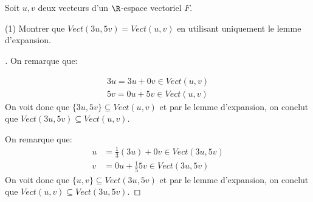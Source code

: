 \section[Demonstrations]{}

Soit \(u, v\) deux vecteurs d'un \(\R\)-espace vectoriel \(F\).

(1) Montrer que \(Vect(3u, 5v) = Vect(u, v)\) en utilisant uniquement le lemme d'expansion.

\begin{proof}[\unskip\nopunct] 
   \fbox{\(\subseteq\)} 
   On remarque que: 

   \begin{align*}
      3u = 3u + 0v \in Vect(u, v)\\ 
      5v = 0u + 5v \in Vect(u, v) 
   \end{align*}   
   On voit donc que \(\{3u, 5v\} \subseteq Vect(u, v)\) et par le lemme d'expansion, on conclut que \(Vect(3u, 5v) \subseteq Vect(u, v)\).\<

   \fbox{\(\supseteq\)}
   On remarque que: 
   \begin{align*}
      u &= \frac{1}{3}(3u) + 0v \in Vect(3u, 5v)\\ 
      v &= 0u + \frac{1}{5}5v \in Vect(3u, 5v) 
   \end{align*}   
   On voit donc que \(\{u, v\} \subseteq Vect(3u, 5v)\) et par le lemme d'expansion, on conclut que \(Vect(u, v) \subseteq Vect(3u, 5v)\).

\end{proof}


\section[Exercices]{}



